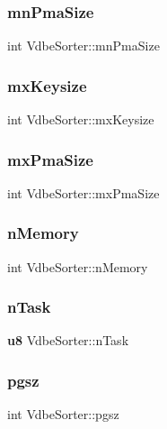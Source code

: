 \mbox{\label{struct_vdbe_sorter_a6d201d0f496260f7f2c7f450cae5898b}} 
\subsubsection{mnPmaSize}
{\footnotesize\ttfamily int Vdbe\+Sorter\+::mn\+Pma\+Size}

\mbox{\label{struct_vdbe_sorter_a378f212fc0dc1eb53662fe9651c83e92}} 
\subsubsection{mxKeysize}
{\footnotesize\ttfamily int Vdbe\+Sorter\+::mx\+Keysize}

\mbox{\label{struct_vdbe_sorter_ab23b8039f7b58052b6c6dfc32aa895ed}} 
\subsubsection{mxPmaSize}
{\footnotesize\ttfamily int Vdbe\+Sorter\+::mx\+Pma\+Size}

\mbox{\label{struct_vdbe_sorter_a53740d50989018beadaff7fe814407f5}} 
\subsubsection{nMemory}
{\footnotesize\ttfamily int Vdbe\+Sorter\+::n\+Memory}

\mbox{\label{struct_vdbe_sorter_a5a6475ca0a9de4321653a4afb4fcbef0}} 
\subsubsection{nTask}
{\footnotesize\ttfamily \textbf{ u8} Vdbe\+Sorter\+::n\+Task}

\mbox{\label{struct_vdbe_sorter_adf515e49daec945d414c95c5793d8b92}} 
\subsubsection{pgsz}
{\footnotesize\ttfamily int Vdbe\+Sorter\+::pgsz}

